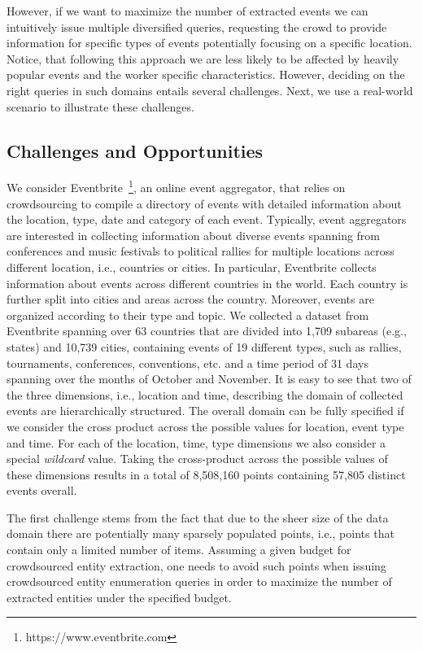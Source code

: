 \documentclass{vldb}
\begin{document}
However, if we want to maximize the number of extracted events we can intuitively issue multiple diversified queries, requesting the crowd to provide information for specific types of events potentially focusing on a specific location. Notice, that following this approach we are less likely to be affected by heavily popular events and the worker specific characteristics. However, deciding on the right queries in such domains entails several challenges. Next, we use a real-world scenario to illustrate these challenges.

\subsection{Challenges and Opportunities}
\label{sec:challenges}
We consider Eventbrite~\footnote{https://www.eventbrite.com}, an online event aggregator, that relies on crowdsourcing to compile a directory of events with detailed information about the location, type, date and category of each event. Typically, event aggregators are interested in collecting information about diverse events spanning from conferences and music festivals to political rallies for multiple locations across different location, i.e., countries or cities. In particular, Eventbrite collects information about events across different countries in the world. Each country is further split into cities and areas across the country. Moreover, events are organized according to their type and topic. We collected a dataset from Eventbrite spanning over 63 countries that are divided into 1,709 subareas (e.g., states) and 10,739 cities, containing events of 19 different types, such as rallies, tournaments, conferences, conventions, etc. and a time period of 31 days spanning over the months of October and November. It is easy to see that two of the three dimensions, i.e., location and time, describing the domain of collected events  are hierarchically structured. The overall domain can be fully specified if we consider the cross product across the possible values for location, event type and time. For each of the location, time, type dimensions we also consider a special {\em wildcard} value. Taking the cross-product across the possible values of these dimensions results in a total of 8,508,160 points containing 57,805 distinct events overall.

The first challenge stems from the fact that due to the sheer size of the data domain there are potentially many sparsely populated points, i.e., points  that contain only a limited number of items. Assuming a given budget for crowdsourced entity extraction, one needs to avoid such points when issuing crowdsourced entity enumeration queries in order to maximize the number of extracted entities under the specified budget. 
\end{document}
